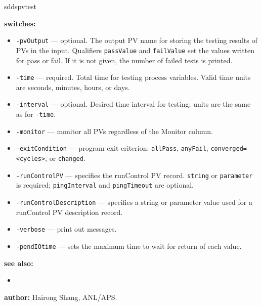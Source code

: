 \begin{sddsprog}{sddspvtest}
\item \textbf{switches:}
\begin{itemize}
  \item {\tt -pvOutput} --- optional. The output PV name for storing the testing results
               of PVs in the input. Qualifiers \verb|passValue| and \verb|failValue| set
               the values written for pass or fail. If it is not given, the number of
               failed tests is printed.
  \item {\tt -time} --- required. Total time for testing process variables.
               Valid time units are seconds, minutes, hours, or days.
  \item {\tt -interval} --- optional. Desired time interval for testing; units are the
               same as for \verb|-time|.
  \item {\tt -monitor} --- monitor all PVs regardless of the Monitor column.
  \item {\tt -exitCondition} --- program exit criterion: \verb|allPass|, \verb|anyFail|,
               \verb|converged=<cycles>|, or \verb|changed|.
  \item {\tt -runControlPV} --- specifies the runControl PV record. \verb|string| or
               \verb|parameter| is required; \verb|pingInterval| and \verb|pingTimeout|
               are optional.
  \item {\tt -runControlDescription} --- specifies a string or parameter value used
               for a runControl PV description record.
  \item {\tt -verbose} --- print out messages.
  \item {\tt -pendIOtime} --- sets the maximum time to wait for return of each value.
\end{itemize}
\item \textbf{see also:}
\begin{itemize}
  \item {}
\end{itemize}
\item \textbf{author:} Hairong Shang, ANL/APS.
\end{sddsprog}
